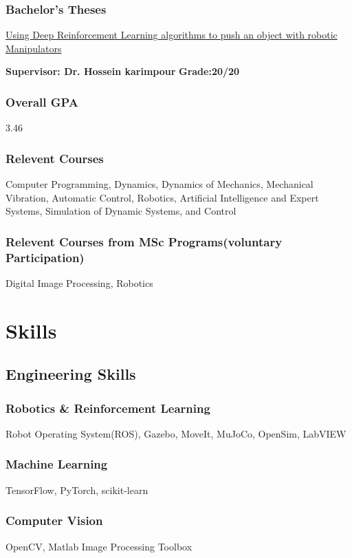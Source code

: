 \documentclass[a4paper]{article}
\begin{document}
        \subsubsection{Bachelor's Theses}
        \href{https://github.com/ake1999/aarm}{Using Deep Reinforcement Learning algorithms to push an object with robotic Manipulators} 

        {\bfseries\small Supervisor: Dr. Hossein karimpour}
        \hfill
        {\bfseries\small Grade:20/20}

        \subsubsection{Overall GPA}
        3.46

        \subsubsection{Relevent Courses}
        Computer Programming, Dynamics, Dynamics of Mechanics, Mechanical Vibration, Automatic Control, Robotics, Artificial Intelligence and Expert Systems, Simulation of Dynamic Systems, and Control

        \subsubsection{Relevent Courses from MSc Programs(voluntary Participation)}
        Digital Image Processing, Robotics

    \section{Skills}
        \subsection{Engineering Skills}
        \subsubsection{Robotics \& Reinforcement Learning}
        Robot Operating System(ROS), Gazebo, MoveIt, MuJoCo, OpenSim, LabVIEW
        \subsubsection{Machine Learning}
        TensorFlow, PyTorch, scikit-learn
        \subsubsection{Computer Vision}
        OpenCV, Matlab Image Processing Toolbox
\end{document}

